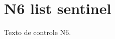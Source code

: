 \documentclass{abntexto-ufc}
\begin{document}
\pretextual


\textual
\section{N6 list sentinel}
Texto de controle N6.
\end{document}
